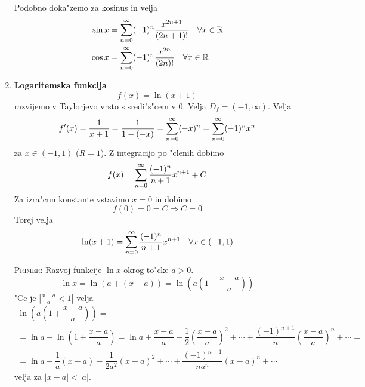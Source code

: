 \begin{enumerate}
    Podobno doka"zemo za kosinus in velja
    \begin{align*}
    \sin x &= \sum_{n = 0}^{\infty} (-1)^n \dfrac{x^{2n + 1}}{(2n + 1)!} \quad \forall x \in \mathbb{R} \\
    \cos x &= \sum_{n = 0}^{\infty} (-1)^n \dfrac{x^{2n}}{(2n)!} \quad \forall x \in \mathbb{R}
    \end{align*}
    
    \item \textbf{Logaritemska funkcija}
    \begin{equation*}
    f(x) = \ln (x + 1)
    \end{equation*}
    razvijemo v Taylorjevo vrsto s sredi"s"cem v 0. Velja $D_f = (-1, \infty)$. Velja
    \begin{equation*}
    f'(x) = \dfrac{1}{x+1} = \dfrac{1}{1 - (-x)} = \sum_{n = 0}^{\infty} (-x)^n = \sum_{n = 0}^{\infty} (-1)^n x^n
    \end{equation*}
   za $x \in (-1, 1)$ ($R = 1$). Z integracijo po "clenih dobimo
   \begin{equation*}
   f(x) = \sum_{n = 0}^{\infty} \dfrac{(-1)^n}{n + 1} x^{n+1} + C
   \end{equation*}
    Za izra"cun konstante vstavimo $x = 0$ in dobimo
    \begin{equation*}
    f(0) = 0 = C \Rightarrow C = 0
    \end{equation*}
    Torej velja
    \begin{equation*}
    \ln(x+1) = \sum_{n = 0}^{\infty} \dfrac{(-1)^n}{n+1} x^{n+1} \quad \forall x \in (-1, 1)
    \end{equation*}
    
    \textsc{Primer:} Razvoj funkcije $\ln x$ okrog to"cke $a > 0$.
    \begin{equation*}
     \ln x = \ln(a + (x - a)) = \ln \left( a \left( 1 + \dfrac{x-a}{a} \right) \right)
    \end{equation*}
    "Ce je $\left| \frac{x - a}{a}  < 1 \right|$ velja
    \begin{multline*}
     \ln \left( a \left( 1 + \dfrac{x-a}{a} \right) \right) = \\
     =\ln a + \ln \left( 1 + \dfrac{x - a}{a} \right) = \ln a + \dfrac{x - a}{a} - \dfrac{1}{2} \left( \dfrac{x - a}{a}\right)^2 + \cdots + \dfrac{(-1)^{n+1}}{n} \left( \dfrac{x - a}{a} \right)^n + \cdots = \\
     = \ln a + \dfrac{1}{a} (x-a) - \dfrac{1}{2a^2} (x - a)^2 + \cdots + \dfrac{(-1)^{n+1}}{na^n} (x - a)^n + \cdots
    \end{multline*}
    velja za $|x - a| < |a|$.
    

\end{enumerate}
